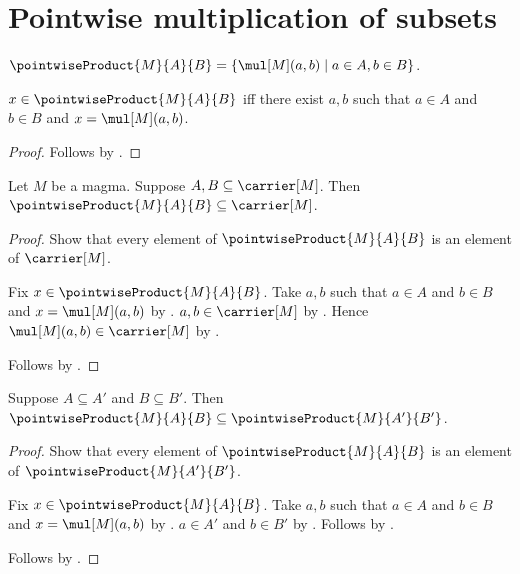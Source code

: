 



\section{Pointwise multiplication of subsets}

\begin{definition}\label{pointwise_product}
    $\pointwiseProduct{M}{A}{B}
        =\{\mul[M](a,b)\mid a\in A,b\in B\}$.
\end{definition}

\begin{proposition}\label{pointwise_product_iff}
    $x\in\pointwiseProduct{M}{A}{B}$ iff there exist $a,b$ such that
        $a\in A$ and $b\in B$ and $x=\mul[M](a,b)$.
\end{proposition}
\begin{proof}
    Follows by .
\end{proof}

\begin{classification}\label{pointwise_product_type}
    Let $M$ be a magma.
    Suppose $A,B\subseteq\carrier[M]$.
    Then $\pointwiseProduct{M}{A}{B}\subseteq\carrier[M]$.
\end{classification}
\begin{proof}
    Show that every element of $\pointwiseProduct{M}{A}{B}$ is an element of
        $\carrier[M]$.
    \begin{subproof}
        Fix $x\in\pointwiseProduct{M}{A}{B}$.
        Take $a,b$ such that $a\in A$ and $b\in B$ and
            $x=\mul[M](a,b)$ by .
        $a,b\in\carrier[M]$ by .
        Hence $\mul[M](a,b)\in\carrier[M]$ by .
    \end{subproof}
    Follows by .
\end{proof}

\begin{proposition}\label{pointwise_product_monotone}
    Suppose $A\subseteq A'$ and $B\subseteq B'$.
    Then $\pointwiseProduct{M}{A}{B}
        \subseteq\pointwiseProduct{M}{A'}{B'}$.
\end{proposition}
\begin{proof}
    Show that every element of $\pointwiseProduct{M}{A}{B}$ is an element of
        $\pointwiseProduct{M}{A'}{B'}$.
    \begin{subproof}
        Fix $x\in\pointwiseProduct{M}{A}{B}$.
        Take $a,b$ such that $a\in A$ and $b\in B$ and
            $x=\mul[M](a,b)$ by .
        $a\in A'$ and $b\in B'$ by .
        Follows by .
    \end{subproof}
    Follows by .
\end{proof}

